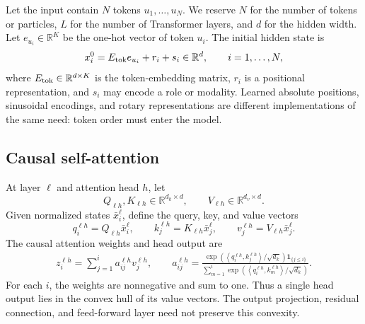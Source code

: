\documentclass[11pt]{amsart}
\numberwithin{equation}{section}
\theoremstyle{definition}
\theoremstyle{plain}
\theoremstyle{remark}
\newcommand{\R}{\mathbb{R}}
\newcommand{\one}{\mathbf{1}}
\newcommand{\ip}[2]{\left\langle#1,#2\right\rangle}
\begin{document}
Let the input contain $N$ tokens $u_1,\ldots,u_N$.  We reserve $N$ for the
number of tokens or particles, $L$ for the number of Transformer layers, and
$d$ for the hidden width.  Let $e_{u_i}\in\R^K$ be the one-hot vector of token
$u_i$.  The initial hidden state is
\begin{equation}\label{eq:input-embedding}
 x_i^0=E_{\rm tok}e_{u_i}+r_i+s_i\in\R^d,
 \qquad i=1,\ldots,N,
\end{equation}
where $E_{\rm tok}\in\R^{d\times K}$ is the token-embedding matrix, $r_i$ is
a positional representation, and $s_i$ may encode a role or modality.  Learned
absolute positions, sinusoidal encodings, and rotary representations are
different implementations of the same need: token order must enter the model.

\subsection{Causal self-attention}

At layer $\ell$ and attention head $h$, let
\[
 Q_{\ell h},K_{\ell h}\in\R^{d_k\times d},
 \qquad
 V_{\ell h}\in\R^{d_v\times d}.
\]
Given normalized states $\bar x_i^\ell$, define the query, key, and value
vectors
\[
 q_i^{\ell h}=Q_{\ell h}\bar x_i^\ell,
 \qquad
 k_j^{\ell h}=K_{\ell h}\bar x_j^\ell,
 \qquad
 v_j^{\ell h}=V_{\ell h}\bar x_j^\ell.
\]
The causal attention weights and head output are
\begin{equation}\label{eq:causal-attention}
\begin{aligned}
  z_i^{\ell h} =\sum_{j=1}^i a_{ij}^{\ell h}v_j^{\ell h}, \qquad 
  a_{ij}^{\ell h} =
 \frac{
  \exp\!\left(\ip{q_i^{\ell h}}{k_j^{\ell h}}/\sqrt{d_k}\right)
  \one_{\{j\le i\}}
 }{
  \displaystyle\sum_{m=1}^i
  \exp\!\left(\ip{q_i^{\ell h}}{k_m^{\ell h}}/\sqrt{d_k}\right)
 }.
\end{aligned}
\end{equation}
For each $i$, the weights are nonnegative and sum to one.  Thus a single head
output lies in the convex hull of its value vectors.  The output projection,
residual connection, and feed-forward layer need not preserve this convexity.
\end{document}
